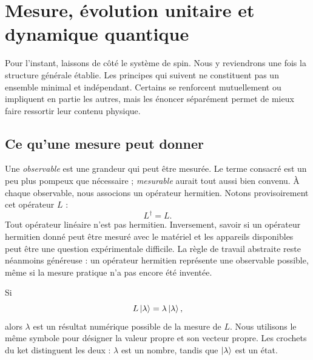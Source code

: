 \chapter{Mesure, évolution unitaire et dynamique quantique}


Pour l’instant, laissons de côté le système de spin. Nous y reviendrons une fois la structure générale établie. Les principes qui suivent ne constituent pas un ensemble minimal et indépendant. Certains se renforcent mutuellement ou impliquent en partie les autres, mais les énoncer séparément permet de mieux faire ressortir leur contenu physique.

\section{Ce qu’une mesure peut donner}

Une \emph{observable} est une grandeur qui peut être mesurée. Le terme consacré est un peu plus pompeux que nécessaire ; \emph{mesurable} aurait tout aussi bien convenu. À chaque observable, nous associons un opérateur hermitien. Notons provisoirement cet opérateur \(L\) :
\begin{equation}
L^\dagger=L.
\end{equation}
Tout opérateur linéaire n’est pas hermitien. Inversement, savoir si un opérateur hermitien donné peut être mesuré avec le matériel et les appareils disponibles peut être une question expérimentale difficile. La règle de travail abstraite reste néanmoins généreuse : un opérateur hermitien représente une observable possible, même si la mesure pratique n’a pas encore été inventée.

Si
\begin{equation}
L\left\lvert\lambda\right\rangle=\lambda\left\lvert\lambda\right\rangle,
\end{equation}
alors \(\lambda\) est un résultat numérique possible de la mesure de \(L\). Nous utilisons le même symbole pour désigner la valeur propre et son vecteur propre. Les crochets du ket distinguent les deux : \(\lambda\) est un nombre, tandis que \(\left\lvert\lambda\right\rangle\) est un état.


